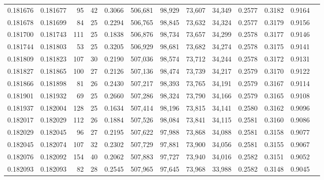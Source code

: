 \begin{tabular}{rrrrrrrrrrrrr}
0.181676 & 0.181677 &    95 &  42 &                                     0.3066 & 506,681 &  98,929 &  73,607 &  34,349 & 0.2577 & 0.3182 & 0.9164 \\
0.181678 & 0.181699 &    84 &  25 &                                     0.2294 & 506,765 &  98,845 &  73,632 &  34,324 & 0.2577 & 0.3179 & 0.9156 \\
0.181700 & 0.181743 &   111 &  25 &                                     0.1838 & 506,876 &  98,734 &  73,657 &  34,299 & 0.2578 & 0.3177 & 0.9146 \\
0.181744 & 0.181803 &    53 &  25 &                                     0.3205 & 506,929 &  98,681 &  73,682 &  34,274 & 0.2578 & 0.3175 & 0.9141 \\
0.181809 & 0.181823 &   107 &  30 &                                     0.2190 & 507,036 &  98,574 &  73,712 &  34,244 & 0.2578 & 0.3172 & 0.9131 \\
0.181827 & 0.181865 &   100 &  27 &                                     0.2126 & 507,136 &  98,474 &  73,739 &  34,217 & 0.2579 & 0.3170 & 0.9122 \\
0.181866 & 0.181898 &    81 &  26 &                                     0.2430 & 507,217 &  98,393 &  73,765 &  34,191 & 0.2579 & 0.3167 & 0.9114 \\
0.181901 & 0.181932 &    69 &  25 &                                     0.2660 & 507,286 &  98,324 &  73,790 &  34,166 & 0.2579 & 0.3165 & 0.9108 \\
0.181937 & 0.182004 &   128 &  25 &                                     0.1634 & 507,414 &  98,196 &  73,815 &  34,141 & 0.2580 & 0.3162 & 0.9096 \\
0.182017 & 0.182029 &   112 &  26 &                                     0.1884 & 507,526 &  98,084 &  73,841 &  34,115 & 0.2581 & 0.3160 & 0.9086 \\
0.182029 & 0.182045 &    96 &  27 &                                     0.2195 & 507,622 &  97,988 &  73,868 &  34,088 & 0.2581 & 0.3158 & 0.9077 \\
0.182045 & 0.182074 &   107 &  32 &                                     0.2302 & 507,729 &  97,881 &  73,900 &  34,056 & 0.2581 & 0.3155 & 0.9067 \\
0.182076 & 0.182092 &   154 &  40 &                                     0.2062 & 507,883 &  97,727 &  73,940 &  34,016 & 0.2582 & 0.3151 & 0.9052 \\
0.182093 & 0.182093 &    82 &  28 &                                     0.2545 & 507,965 &  97,645 &  73,968 &  33,988 & 0.2582 & 0.3148 & 0.9045 \\

\end{tabular}
